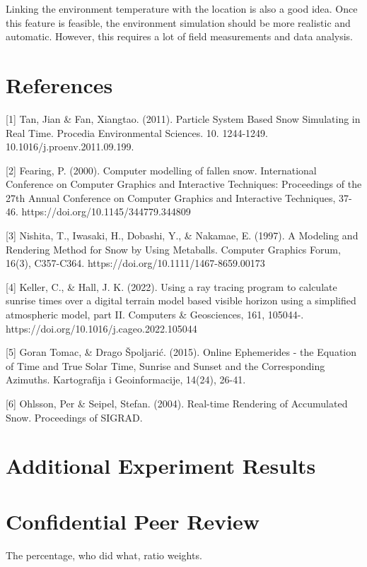 \documentclass{article}
\begin{document}
Linking the environment temperature with the location is also a good idea. Once this feature is feasible, the environment simulation 
should be more realistic and automatic. However, this requires a lot of field measurements and data analysis.

\section*{References}

{
\small

[1] Tan, Jian \& Fan, Xiangtao. (2011). Particle System Based Snow Simulating in Real Time. Procedia Environmental Sciences. 
10. 1244-1249. 10.1016/j.proenv.2011.09.199. 

[2] Fearing, P. (2000). Computer modelling of fallen snow. International Conference on Computer Graphics and Interactive 
Techniques: Proceedings of the 27th Annual Conference on Computer Graphics and Interactive Techniques, 37-46. 
https://doi.org/10.1145/344779.344809

[3] Nishita, T., Iwasaki, H., Dobashi, Y., \& Nakamae, E. (1997). A Modeling and Rendering Method for Snow by Using Metaballs. 
Computer Graphics Forum, 16(3), C357-C364. https://doi.org/10.1111/1467-8659.00173

[4] Keller, C., \& Hall, J. K. (2022). Using a ray tracing program to calculate sunrise times over a digital terrain model based 
visible horizon using a simplified atmospheric model, part II. Computers \& Geosciences, 161, 105044-. 
https://doi.org/10.1016/j.cageo.2022.105044

[5] Goran Tomac, \& Drago Špoljarić. (2015). Online Ephemerides - the Equation of Time and True Solar Time, Sunrise and Sunset and 
the Corresponding Azimuths. Kartografija i Geoinformacije, 14(24), 26-41.

[6] Ohlsson, Per \& Seipel, Stefan. (2004). Real-time Rendering of Accumulated Snow. Proceedings of SIGRAD. 

}
\section*{Additional Experiment Results}

\section*{Confidential Peer Review} 

The percentage, who did what, ratio weights. 
\end{document}
